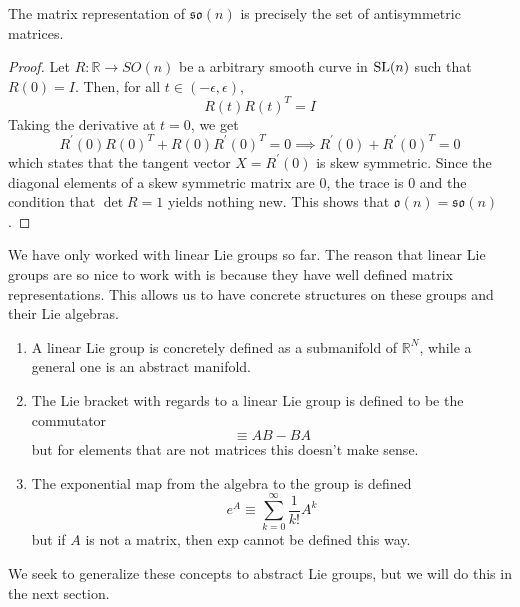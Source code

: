   \begin{theorem}
    The matrix representation of $\mathfrak{so}(n)$ is precisely the set of antisymmetric matrices. 
  \end{theorem}
  \begin{proof}
    Let $R: \mathbb{R} \longrightarrow SO(n)$ be a arbitrary smooth curve in $\operatorname{SL}(n)$ such that $R(0) = I$. Then, for all $t \in (-\epsilon, \epsilon)$, 
    \begin{equation}
      R(t) R(t)^T = I
    \end{equation}
    Taking the derivative at $t = 0$, we get
    \begin{equation}
      R^\prime (0) R(0)^T + R(0) R^\prime(0)^T = 0 \implies R^\prime (0) + R^\prime(0)^T = 0
    \end{equation}
    which states that the tangent vector $X = R^\prime (0)$ is skew symmetric. Since the diagonal elements of a skew symmetric matrix are $0$, the trace is $0$ and the condition that $\det{R} = 1$ yields nothing new. This shows that $\mathfrak{o}(n) = \mathfrak{so}(n)$. 
  \end{proof}




  We have only worked with linear Lie groups so far. The reason that linear Lie groups are so nice to work with is because they have well defined matrix representations. This allows us to have concrete structures on these groups and their Lie algebras. 
  \begin{enumerate}
    \item A linear Lie group is concretely defined as a submanifold of $\mathbb{R}^N$, while a general one is an abstract manifold. 
    \item The Lie bracket with regards to a linear Lie group is defined to be the commutator 
      \begin{equation}
        [A,B] \equiv A B - B A
      \end{equation}
    but for elements that are not matrices this doesn't make sense. 

    \item The exponential map from the algebra to the group is defined
      \begin{equation}
        e^A \equiv \sum_{k=0}^\infty \frac{1}{k!} A^k
      \end{equation}
    but if $A$ is not a matrix, then exp cannot be defined this way.
  \end{enumerate}
  We seek to generalize these concepts to abstract Lie groups, but we will do this in the next section. 

